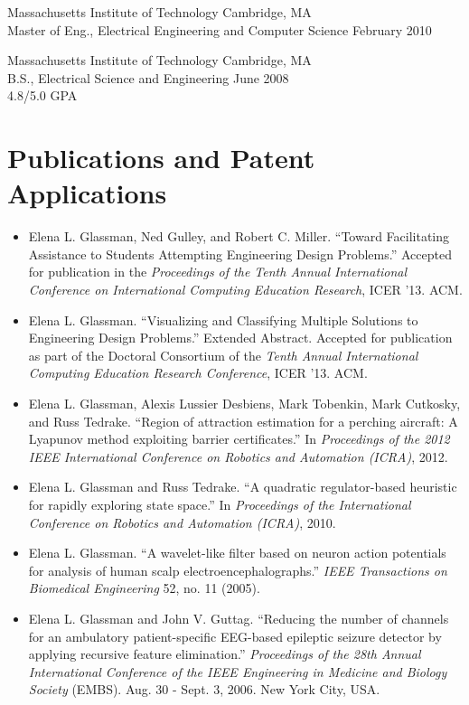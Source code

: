 \documentclass[margin]{res}
\begin{document}
\begin{resume}
Massachusetts Institute of Technology \hfill Cambridge, MA \\
Master of Eng., Electrical Engineering and Computer Science \hfill February 2010

Massachusetts Institute of Technology \hfill Cambridge, MA \\
B.S., Electrical Science and Engineering \hfill June 2008 \\
4.8/5.0 GPA
 
 \section{Publications and Patent Applications}

\begin{itemize}
\item Elena L. Glassman, Ned Gulley, and Robert C. Miller. ``Toward Facilitating Assistance to Students Attempting
Engineering Design Problems.'' Accepted for publication in the \textit{Proceedings of the Tenth Annual International Conference on
International Computing Education Research}, ICER '13. ACM.

\item Elena L. Glassman. ``Visualizing and Classifying Multiple Solutions to Engineering Design Problems.'' Extended Abstract. Accepted for publication as part of the Doctoral Consortium of the \textit{Tenth Annual International Computing Education Research Conference}, ICER '13. ACM.

\item Elena L. Glassman, Alexis Lussier Desbiens, Mark Tobenkin, Mark Cutkosky, and Russ Tedrake. ``Region of attraction estimation for a perching aircraft: A Lyapunov method exploiting barrier certificates.'' In \textit{Proceedings of the 2012 IEEE International Conference on Robotics and Automation (ICRA)}, 2012.

\item Elena L. Glassman and Russ Tedrake. ``A quadratic regulator-based heuristic for rapidly exploring state space.'' In \textit{Proceedings of the International Conference on Robotics and Automation (ICRA)}, 2010.
 
	\item Elena L. Glassman. ``A wavelet-like filter based on neuron action potentials for analysis of human scalp electroencephalographs.'' \textit{IEEE Transactions on Biomedical Engineering} 52, no. 11 (2005).

	\item Elena L. Glassman and John V. Guttag. ``Reducing the number of channels for an ambulatory patient-specific EEG-based epileptic seizure detector by applying recursive feature elimination.'' \textit{Proceedings of the 28th Annual International Conference of the IEEE Engineering in Medicine and Biology Society} (EMBS). Aug. 30 - Sept. 3, 2006. New York City, USA.


\end{itemize}
\end{resume}
\end{document}
